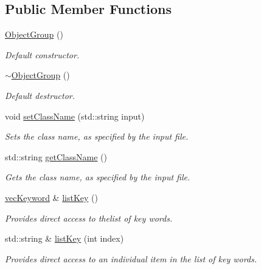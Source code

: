 \subsection*{Public Member Functions}
\begin{DoxyCompactItemize}
\item 
\hyperlink{classosea_1_1_object_group_af4d309432161dab231e33e83acaf4161}{Object\-Group} ()
\begin{DoxyCompactList}\small\item\em Default constructor. \end{DoxyCompactList}\item 
\hyperlink{classosea_1_1_object_group_a58c2e7cf18338d3fbe47f30fafca3c77}{$\sim$\-Object\-Group} ()
\begin{DoxyCompactList}\small\item\em Default destructor. \end{DoxyCompactList}\item 
void \hyperlink{classosea_1_1_object_group_afe112da71222da5ed206dc81636b3ca7}{set\-Class\-Name} (std\-::string input)
\begin{DoxyCompactList}\small\item\em Sets the class name, as specified by the input file. \end{DoxyCompactList}\item 
std\-::string \hyperlink{classosea_1_1_object_group_aa158e9516621ab6e2b690bad6c6619b5}{get\-Class\-Name} ()
\begin{DoxyCompactList}\small\item\em Gets the class name, as specified by the input file. \end{DoxyCompactList}\item 
\hyperlink{namespaceosea_af47d453cb217c2c461685cd6e754c070}{vec\-Keyword} \& \hyperlink{classosea_1_1_object_group_a0f44d28c868ba60971af1a7aceb2e5bd}{list\-Key} ()
\begin{DoxyCompactList}\small\item\em Provides direct access to thelist of key words. \end{DoxyCompactList}\item 
std\-::string \& \hyperlink{classosea_1_1_object_group_a4b52a556b4404a1d13d50d0a3808eec2}{list\-Key} (int index)
\begin{DoxyCompactList}\small\item\em Provides direct access to an individual item in the list of key words. \end{DoxyCompactList}\item 

\end{DoxyCompactItemize}
